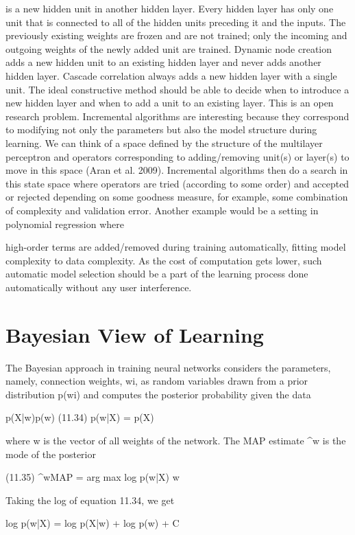 is a new hidden unit in another hidden layer. Every hidden layer has only one unit that is connected to all of the hidden units preceding it and the inputs. The previously existing weights are frozen and are not trained; only the incoming and outgoing weights of the newly added unit are trained. Dynamic node creation adds a new hidden unit to an existing hidden layer and never adds another hidden layer. Cascade correlation always adds a new hidden layer with a single unit. The ideal constructive method should be able to decide when to introduce a new hidden layer and when to add a unit to an existing layer. This is an open research problem. Incremental algorithms are interesting because they correspond to modifying not only the parameters but also the model structure during learning. We can think of a space defined by the structure of the multilayer perceptron and operators corresponding to adding/removing unit(s) or layer(s) to move in this space (Aran et al. 2009). Incremental algorithms then do a search in this state space where operators are tried (according to some order) and accepted or rejected depending on some goodness measure, for example, some combination of complexity and validation error. Another example would be a setting in polynomial regression where

high-order terms are added/removed during training automatically, fitting model complexity to data complexity. As the cost of computation gets lower, such automatic model selection should be a part of the learning process done automatically without any user interference.

\section{Bayesian View of Learning}

The Bayesian approach in training neural networks considers the parameters, namely, connection weights, wi, as random variables drawn from a prior distribution p(wi) and computes the posterior probability given the data

p(X|w)p(w) (11.34) p(w|X) = p(X)

where w is the vector of all weights of the network. The MAP estimate \textasciicircum{}w is the mode of the posterior

(11.35) \textasciicircum{}wMAP = arg max log p(w|X) w

Taking the log of equation 11.34, we get

log p(w|X) = log p(X|w) + log p(w) + C

